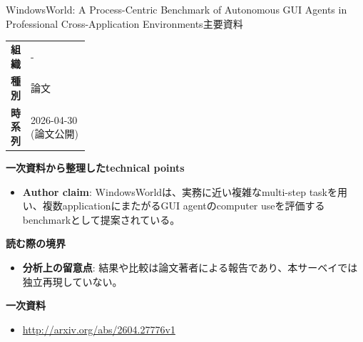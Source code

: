 \begin{technicalnote}{WindowsWorld: A Process-Centric Benchmark of Autonomous GUI Agents in Professional Cross-Application Environments}{主要資料}
\begingroup
\begin{tabularx}{\linewidth}{@{}>{\bfseries}p{0.22\linewidth}X@{}}
組織 & - \\
種別 & 論文 \\
時系列 & 2026-04-30 (論文公開) \\
\end{tabularx}
\smallskip
{\bfseries 一次資料から整理したtechnical points}
\begin{itemize}[leftmargin=1.5em,itemsep=0.35em]
\item \textbf{Author claim}: WindowsWorldは、実務に近い複雑なmulti-step taskを用い、複数applicationにまたがるGUI agentのcomputer useを評価するbenchmarkとして提案されている。
\end{itemize}
{\bfseries 読む際の境界}
\begin{itemize}[leftmargin=1.5em,itemsep=0.35em]
\item \textbf{分析上の留意点}: 結果や比較は論文著者による報告であり、本サーベイでは独立再現していない。
\end{itemize}
\begin{samepage}
{\bfseries 一次資料}
\begingroup\sloppy
\begin{itemize}[leftmargin=1.5em,itemsep=0.25em]
\item {\scriptsize\url{http://arxiv.org/abs/2604.27776v1}}
\end{itemize}
\endgroup
\end{samepage}
\endgroup
\end{technicalnote}
\medskip

